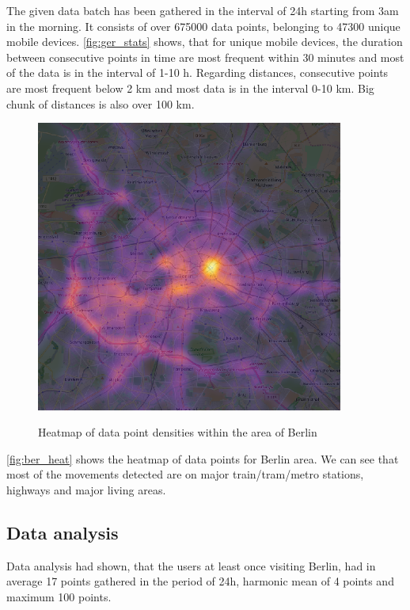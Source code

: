 The given data batch has been gathered in the interval of 24h starting from 3am in the morning. It consists of over 675000 data points, belonging to 47300 unique mobile devices. \autoref{fig:ger_stats} shows, that for unique mobile devices, the duration between consecutive points in time are most frequent within 30 minutes and most of the data is in the interval of 1-10 h. Regarding distances, consecutive points are most frequent below 2 km and most data is in the interval 0-10 km. Big chunk of distances is also over 100 km. 

\begin{figure}[!ht]
	\centering
	\includegraphics[width=0.9\textwidth]{images/points_berlin_heatmap.png}\\
	\caption{Heatmap of data point densities within the area of Berlin}
	\label{fig:ber_heat}
\end{figure}
\FloatBarrier
\autoref{fig:ber_heat} shows the heatmap of data points for Berlin area. We can see that most of the movements detected are on major train/tram/metro stations, highways and major living areas. 

\subsection{Data analysis}
\label{cha:dataanaly}

Data analysis had shown, that the users at least once visiting Berlin, had in average 17 points gathered in the period of 24h, harmonic mean of 4 points and maximum 100 points.

